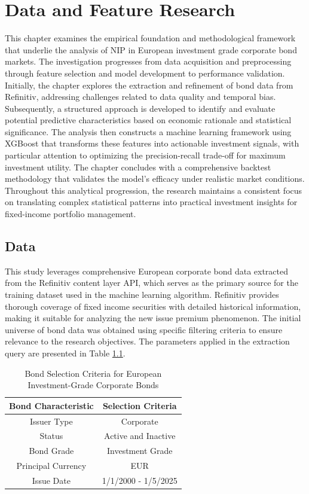 \chapter{Data and Feature Research}
\label{ch:Data and Feature Research}

This chapter examines the empirical foundation and methodological framework that underlie the analysis of NIP in European investment grade corporate bond markets. The investigation progresses from data acquisition and preprocessing through feature selection and model development to performance validation. Initially, the chapter explores the extraction and refinement of bond data from Refinitiv, addressing challenges related to data quality and temporal bias. Subsequently, a structured approach is developed to identify and evaluate potential predictive characteristics based on economic rationale and statistical significance. The analysis then constructs a machine learning framework using XGBoost that transforms these features into actionable investment signals, with particular attention to optimizing the precision-recall trade-off for maximum investment utility. The chapter concludes with a comprehensive backtest methodology that validates the model's efficacy under realistic market conditions. Throughout this analytical progression, the research maintains a consistent focus on translating complex statistical patterns into practical investment insights for fixed-income portfolio management.

\section{Data}
\label{sec:Data}

This study leverages comprehensive European corporate bond data extracted from the Refinitiv content layer API, which serves as the primary source for the training dataset used in the machine learning algorithm. Refinitiv provides thorough coverage of fixed income securities with detailed historical information, making it suitable for analyzing the new issue premium phenomenon. The initial universe of bond data was obtained using specific filtering criteria to ensure relevance to the research objectives. The parameters applied in the extraction query are presented in Table \ref{tab:filter_criteria}.

\begin{table}[h]
    \centering
    \small
    \begin{tabular}{cc}\toprule
         \textbf{Bond Characteristic}& \textbf{Selection Criteria}\\\midrule
         Issuer Type& Corporate\\
         Status& Active and Inactive\\
         Bond Grade& Investment Grade\\
         Principal Currency& EUR\\
         Issue Date& 1/1/2000 - 1/5/2025\\ \bottomrule
    \end{tabular}
    \caption{Bond Selection Criteria for European Investment-Grade Corporate Bonds}
    \label{tab:filter_criteria}
\end{table}

